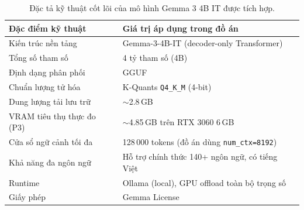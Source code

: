\begin{table}[!htb]
    \centering
    \caption{Đặc tả kỹ thuật cốt lõi của mô hình Gemma 3 4B IT được tích hợp.}
    \label{tab:gemma3_specs}
    \renewcommand{\arraystretch}{1.3}
    \begin{tabular}{|l|p{8cm}|}
         \hline
         \textbf{Đặc điểm kỹ thuật} & \textbf{Giá trị áp dụng trong đồ án} \\ \hline
         Kiến trúc nền tảng & Gemma-3-4B-IT (decoder-only Transformer) \\ \hline
         Tổng số tham số & 4 tỷ tham số (4B) \\ \hline
         Định dạng phân phối & GGUF \\ \hline
         Chuẩn lượng tử hóa & K-Quants \texttt{Q4\_K\_M} (4-bit) \\ \hline
         Dung lượng tải lưu trữ & $\sim$2.8\,GB \\ \hline
         VRAM tiêu thụ thực đo (P3) & $\sim$4.85\,GB trên RTX 3060 6\,GB \\ \hline
         Cửa sổ ngữ cảnh tối đa & 128\,000 tokens (đồ án dùng \texttt{num\_ctx=8192}) \\ \hline
         Khả năng đa ngôn ngữ & Hỗ trợ chính thức 140+ ngôn ngữ, có tiếng Việt \\ \hline
         Runtime & Ollama (local), GPU offload toàn bộ trọng số \\ \hline
         Giấy phép & Gemma License \\ \hline
    \end{tabular}
\end{table}
